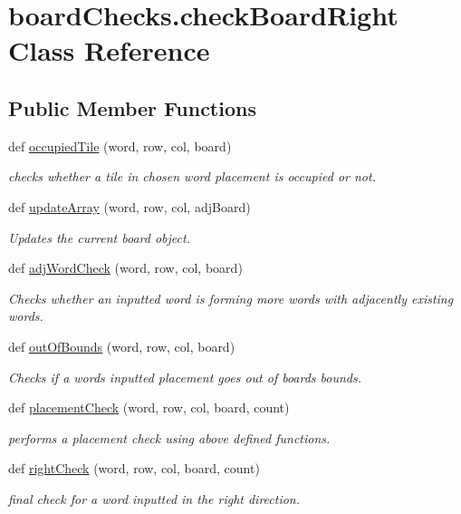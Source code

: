 \hypertarget{classboard_checks_1_1check_board_right}{}\section{board\+Checks.\+check\+Board\+Right Class Reference}
\label{classboard_checks_1_1check_board_right}
\subsection*{Public Member Functions}
\begin{DoxyCompactItemize}
\item 
def \hyperlink{classboard_checks_1_1check_board_right_ad361fe238316b76956b1b2918143d069}{occupied\+Tile} (word, row, col, board)
\begin{DoxyCompactList}\small\item\em checks whether a tile in chosen word placement is occupied or not. \end{DoxyCompactList}\item 
def \hyperlink{classboard_checks_1_1check_board_right_a2c96a3e11772231852720539a8ac1430}{update\+Array} (word, row, col, adj\+Board)
\begin{DoxyCompactList}\small\item\em Updates the current board object. \end{DoxyCompactList}\item 
def \hyperlink{classboard_checks_1_1check_board_right_a92dfcdf78db9f0a5fe8848529987327a}{adj\+Word\+Check} (word, row, col, board)
\begin{DoxyCompactList}\small\item\em Checks whether an inputted word is forming more words with adjacently existing words. \end{DoxyCompactList}\item 
def \hyperlink{classboard_checks_1_1check_board_right_a8bbad282fad43d8348073ff0a6a3748c}{out\+Of\+Bounds} (word, row, col, board)
\begin{DoxyCompactList}\small\item\em Checks if a words inputted placement goes out of boards bounds. \end{DoxyCompactList}\item 
def \hyperlink{classboard_checks_1_1check_board_right_a19735f7a568095a393d40f08684e9d1f}{placement\+Check} (word, row, col, board, count)
\begin{DoxyCompactList}\small\item\em performs a placement check using above defined functions. \end{DoxyCompactList}\item 
def \hyperlink{classboard_checks_1_1check_board_right_a0ea42c96718ef916ea9242b113abb49f}{right\+Check} (word, row, col, board, count)
\begin{DoxyCompactList}\small\item\em final check for a word inputted in the right direction. \end{DoxyCompactList}\end{DoxyCompactItemize}


